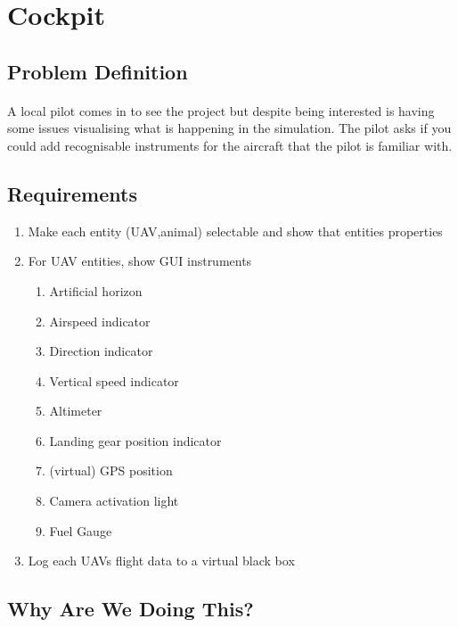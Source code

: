 \documentclass[11pt]{book}
\begin{document}
\clearpage








\section{Cockpit}

\subsection{Problem Definition}

\paragraph{} A local pilot comes in to see the project but despite being interested is having some issues visualising what is happening in the simulation. The pilot asks if you could add recognisable instruments for the aircraft that the pilot is familiar with.

\subsection{Requirements}

\begin{enumerate}
\item Make each entity (UAV,animal) selectable and show that entities properties
\item For UAV entities, show GUI instruments
    \begin{enumerate}
        \item Artificial horizon
        \item Airspeed indicator
        \item Direction indicator
        \item Vertical speed indicator
        \item Altimeter
        \item Landing gear position indicator
        \item (virtual) GPS position
        \item Camera activation light
        \item Fuel Gauge
    \end{enumerate}
\item Log each UAVs flight data to a virtual black box
\end{enumerate}

\subsection{Why Are We Doing This?}
\end{document}
